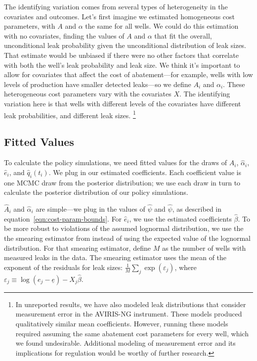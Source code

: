 The identifying variation comes from several types of heterogeneity in the covariates and outcomes.
Let's first imagine we estimated homogeneous cost parameters, with \(A\) and \(\alpha\) the same for all wells.
We could do this estimation with no covariates, finding the values of \(A\) and \(\alpha\) that fit the overall, unconditional leak probability given the unconditional distribution of leak sizes.
That estimate would be unbiased if there were no other factors that correlate with both the well's leak probability and leak size.
We think it's important to allow for covariates that affect the cost of abatement---for example, wells with low levels of production have smaller detected leaks---so we define \(A_i\) and \(\alpha_i\).
These heterogeneous cost parameters vary with the covariates \(X\).
The identifying variation here is that wells with different levels of the covariates have different leak probabilities, and different leak sizes.
\footnote{%
In unreported results, we have also modeled leak distributions that consider measurement error in the \gls{AVIRIS-NG} instrument.
These models produced qualitatively similar mean coefficients.
However, running these models required assuming the same abatement cost parameters for every well, which we found undesirable.
Additional modeling of measurement error and its implications for regulation would be worthy of further research.
}



\subsection{Fitted Values}
\label{sec:fitted-values}

To calculate the policy simulations, we need fitted values for the draws of \(\hat{A}_i\), \(\hat{\alpha}_i\), \(\hat{e}_i\), and \(\hat{q}_i(t_i)\).
We plug in our estimated coefficients.
Each coefficient value is one \gls{MCMC} draw from the posterior distribution; we use each draw in turn to calculate the posterior distribution of our policy simulations.

\(\hat{A}_i\) and \(\hat{\alpha}_i\) are simple---we plug in the values of \(\hat{\psi}\) and \(\hat{\psi}\), as described in equation~\ref{eqn:cost-param-bounds}.
For \(\hat{e}_i\), we use the estimated coefficients \(\hat{\beta}\).
To be more robust to violations of the assumed lognormal distribution, we use the the smearing estimator from \textcite{Manning/Duan/Rogers:1987} instead of using the expected value of the lognormal distribution.
For that smearing estimator, define \(M\) as the number of wells with measured leaks in the data.
The smearing estimator uses the mean of the exponent of the residuals for leak sizes:
\(\frac{1}{M} \sum_j \exp(\varepsilon_j)\), where
\(\varepsilon_j \equiv \log(e_j - \underline{e}) - X_j \hat{\beta}\).

